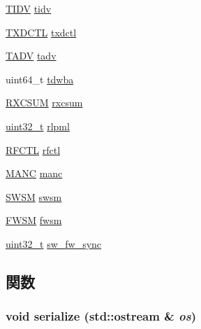 \begin{DoxyCompactItemize}
\item 
\hyperlink{structiGbReg_1_1Regs_1_1TIDV}{TIDV} \hyperlink{structiGbReg_1_1Regs_a5a6fc226edb656c090d075c1064fe0d5}{tidv}
\item 
\hyperlink{structiGbReg_1_1Regs_1_1TXDCTL}{TXDCTL} \hyperlink{structiGbReg_1_1Regs_a3d8c32f0d48138f48863430f0c591850}{txdctl}
\item 
\hyperlink{structiGbReg_1_1Regs_1_1TADV}{TADV} \hyperlink{structiGbReg_1_1Regs_a900770ffadce14bf9ff68603b7e4b9ae}{tadv}
\item 
uint64\_\-t \hyperlink{structiGbReg_1_1Regs_a7d4a53842dc287993e93799f84b676ea}{tdwba}
\item 
\hyperlink{structiGbReg_1_1Regs_1_1RXCSUM}{RXCSUM} \hyperlink{structiGbReg_1_1Regs_a66c393d9c38b0a6666d993ad7462a6ba}{rxcsum}
\item 
\hyperlink{Type_8hh_a435d1572bf3f880d55459d9805097f62}{uint32\_\-t} \hyperlink{structiGbReg_1_1Regs_a5ec909db587986b48557c064d55d096f}{rlpml}
\item 
\hyperlink{structiGbReg_1_1Regs_1_1RFCTL}{RFCTL} \hyperlink{structiGbReg_1_1Regs_a57fcf2d77a3ebd0de133c82600a8f77f}{rfctl}
\item 
\hyperlink{structiGbReg_1_1Regs_1_1MANC}{MANC} \hyperlink{structiGbReg_1_1Regs_a6443796fda5ce30a8d6349e509a8cb5a}{manc}
\item 
\hyperlink{structiGbReg_1_1Regs_1_1SWSM}{SWSM} \hyperlink{structiGbReg_1_1Regs_a225bc3356ed3b52588f8cb4d718f23ff}{swsm}
\item 
\hyperlink{structiGbReg_1_1Regs_1_1FWSM}{FWSM} \hyperlink{structiGbReg_1_1Regs_af10ef7bffcad5d95fbd808b0581339d4}{fwsm}
\item 
\hyperlink{Type_8hh_a435d1572bf3f880d55459d9805097f62}{uint32\_\-t} \hyperlink{structiGbReg_1_1Regs_a43e2669b3871b70ea444bee307339af4}{sw\_\-fw\_\-sync}
\end{DoxyCompactItemize}


\subsection{関数}
\hypertarget{structiGbReg_1_1Regs_a53e036786d17361be4c7320d39c99b84}{
\subsubsection[{serialize}]{\setlength{\rightskip}{0pt plus 5cm}void serialize (std::ostream \& {\em os})}}
\label{structiGbReg_1_1Regs_a53e036786d17361be4c7320d39c99b84}



